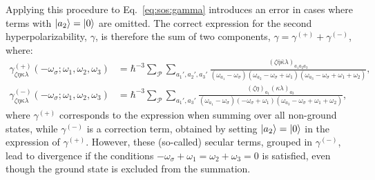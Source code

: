 \documentclass[12pt,a4paper]{article}
\begin{document}
Applying this procedure to Eq.~\eqref{eq:sos:gamma} introduces an error in cases where terms with $\ket{a_2} = \ket{0}$ are omitted. The correct expression for the second hyperpolarizability, $\gamma$, is therefore the sum of two components, $\gamma = \gamma^{(+)} + \gamma^{(-)}$, where:
\begin{align}
	\gamma_{\zeta\eta\kappa\lambda}^{(+)}(-\omega_\sigma; \omega_1, \omega_2, \omega_3) &= \hbar^{-3} \sum_\mathcal{P} \sum_{a_1', a_2', a_3'} \frac{(\zeta \bar{\eta} \bar{\kappa} \lambda)_{a_1 a_2 a_3}}{(\omega_{a_1} - \omega_\sigma)(\omega_{a_2} - \omega_\sigma + \omega_1)(\omega_{a_3} - \omega_\sigma + \omega_1 + \omega_2)}, \nonumber\\
	\gamma_{\zeta\eta\kappa\lambda}^{(-)}(-\omega_\sigma; \omega_1, \omega_2, \omega_3) &= \hbar^{-3} \sum_\mathcal{P} \sum_{a_1', a_3'} \frac{(\zeta \eta)_{a_1} (\kappa \lambda)_{a_3}}{(\omega_{a_1} - \omega_\sigma)(-\omega_\sigma + \omega_1)(\omega_{a_3} - \omega_\sigma + \omega_1 + \omega_2)},
	\label{eq:fluct:gamma}
\end{align}
where $\gamma^{(+)}$ corresponds to the expression when summing over all non-ground states, while $\gamma^{(-)}$ is a correction term, obtained by setting $\ket{a_2} = \ket{0}$ in the expression of $\gamma^{(+)}$. However, these (so-called) secular terms, grouped in $\gamma^{(-)}$, lead to divergence if the conditions $-\omega_\sigma + \omega_1 = \omega_2 + \omega_3 = 0$ is satisfied, even though the ground state is excluded from the summation.
\end{document}
